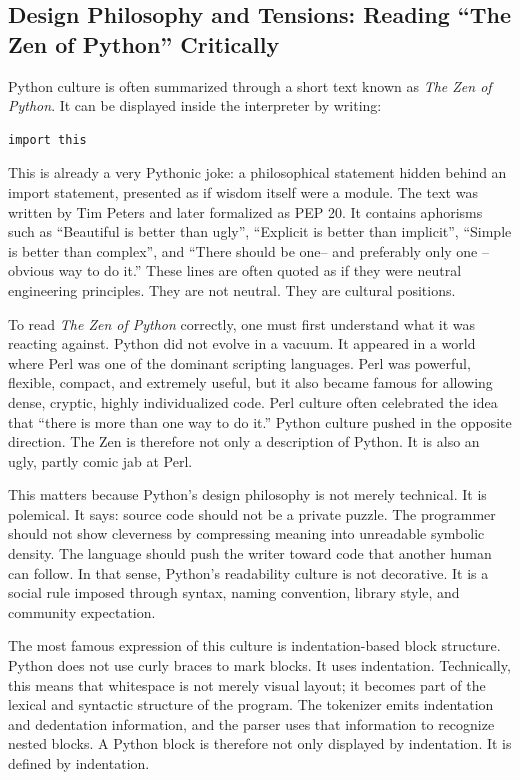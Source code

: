 \subsection{Design Philosophy and Tensions: Reading “The Zen of Python” Critically}

Python culture is often summarized through a short text known as \emph{The Zen of Python}. It can be displayed inside the interpreter by writing:

\begin{verbatim}
import this
\end{verbatim}

This is already a very Pythonic joke: a philosophical statement hidden behind an import statement, presented as if wisdom itself were a module. The text was written by Tim Peters and later formalized as PEP 20. It contains aphorisms such as “Beautiful is better than ugly”, “Explicit is better than implicit”, “Simple is better than complex”, and “There should be one-- and preferably only one --obvious way to do it.” These lines are often quoted as if they were neutral engineering principles. They are not neutral. They are cultural positions.

To read \emph{The Zen of Python} correctly, one must first understand what it was reacting against. Python did not evolve in a vacuum. It appeared in a world where Perl was one of the dominant scripting languages. Perl was powerful, flexible, compact, and extremely useful, but it also became famous for allowing dense, cryptic, highly individualized code. Perl culture often celebrated the idea that “there is more than one way to do it.” Python culture pushed in the opposite direction. The Zen is therefore not only a description of Python. It is also an ugly, partly comic jab at Perl.

This matters because Python’s design philosophy is not merely technical. It is polemical. It says: source code should not be a private puzzle. The programmer should not show cleverness by compressing meaning into unreadable symbolic density. The language should push the writer toward code that another human can follow. In that sense, Python’s readability culture is not decorative. It is a social rule imposed through syntax, naming convention, library style, and community expectation.

The most famous expression of this culture is indentation-based block structure. Python does not use curly braces to mark blocks. It uses indentation. Technically, this means that whitespace is not merely visual layout; it becomes part of the lexical and syntactic structure of the program. The tokenizer emits indentation and dedentation information, and the parser uses that information to recognize nested blocks. A Python block is therefore not only displayed by indentation. It is defined by indentation.

